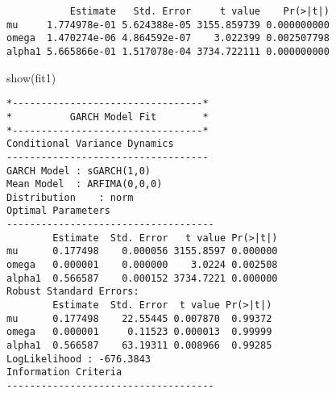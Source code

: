 \documentclass[
  ignorenonframetext,
]{beamer}
\newenvironment{Shaded}{\begin{snugshade}}{\end{snugshade}}
\newcommand{\FunctionTok}[1]{\textcolor[rgb]{0.00,0.00,0.00}{#1}}
\newcommand{\NormalTok}[1]{#1}
\newcommand{\SpecialCharTok}[1]{\textcolor[rgb]{0.00,0.00,0.00}{#1}}
\newenvironment{Shaded}{\begin{snugshade}}{\end{snugshade}}
\newcommand{\FunctionTok}[1]{\textcolor[rgb]{0.00,0.00,0.00}{#1}}
\newcommand{\NormalTok}[1]{#1}
\newcommand{\SpecialCharTok}[1]{\textcolor[rgb]{0.00,0.00,0.00}{#1}}
\begin{document}
\begin{frame}[fragile]
\begin{Shaded}
\end{Shaded}
\begin{verbatim}
           Estimate   Std. Error     t value    Pr(>|t|)
mu     1.774978e-01 5.624388e-05 3155.859739 0.000000000
omega  1.470274e-06 4.864592e-07    3.022399 0.002507798
alpha1 5.665866e-01 1.517078e-04 3734.722111 0.000000000
\end{verbatim}
\begin{Shaded}
\begin{Highlighting}[]
\FunctionTok{show}\NormalTok{(fit1)}
\end{Highlighting}
\end{Shaded}
\begin{verbatim}
*---------------------------------*
*          GARCH Model Fit        *
*---------------------------------*
Conditional Variance Dynamics   
-----------------------------------
GARCH Model : sGARCH(1,0)
Mean Model  : ARFIMA(0,0,0)
Distribution    : norm 
Optimal Parameters
------------------------------------
        Estimate  Std. Error   t value Pr(>|t|)
mu      0.177498    0.000056 3155.8597 0.000000
omega   0.000001    0.000000    3.0224 0.002508
alpha1  0.566587    0.000152 3734.7221 0.000000
Robust Standard Errors:
        Estimate  Std. Error  t value Pr(>|t|)
mu      0.177498    22.55445 0.007870  0.99372
omega   0.000001     0.11523 0.000013  0.99999
alpha1  0.566587    63.19311 0.008966  0.99285
LogLikelihood : -676.3843 
Information Criteria
------------------------------------
                    

\end{verbatim}
\end{frame}
\end{document}
